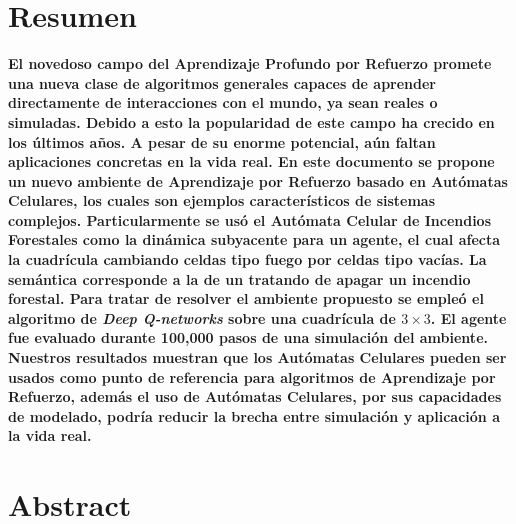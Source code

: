 \documentclass[
  12pt,
  openany]{book}
\author{}
\date{\vspace{-2.5em}}
\newenvironment{preliminary}%
{\pagestyle{empty}\pagenumbering{roman}}%
{\pagenumbering{arabic}}
\begin{document}
\begin{preliminary}






\end{preliminary}

\hypertarget{resumen}{%
\chapter*{Resumen}\label{resumen}}

\textbf{\large{El novedoso campo del Aprendizaje Profundo por Refuerzo promete una nueva clase de algoritmos generales capaces de aprender directamente de interacciones con el mundo, ya sean reales o simuladas. Debido a esto la popularidad de este campo ha crecido en los últimos años. A pesar de su enorme potencial, aún faltan aplicaciones concretas en la vida real. En este documento se propone un nuevo ambiente de Aprendizaje por Refuerzo basado en Autómatas Celulares, los cuales son ejemplos característicos de sistemas complejos. Particularmente se usó el Autómata Celular de Incendios Forestales como la dinámica subyacente para un agente, el cual afecta la cuadrícula cambiando celdas tipo fuego por celdas tipo vacías. La semántica corresponde a la de un  tratando de apagar un incendio forestal. Para tratar de resolver el ambiente propuesto se empleó el algoritmo de \emph{Deep Q-networks} sobre una cuadrícula de $3 \times 3$. El agente fue evaluado durante 100,000 pasos de una simulación del ambiente. Nuestros resultados muestran que los Autómatas Celulares pueden ser usados como punto de referencia para algoritmos de Aprendizaje por Refuerzo, además el uso de Autómatas Celulares, por sus capacidades de modelado, podría reducir la brecha entre simulación y aplicación a la vida real.}}

\hypertarget{abstract}{%
\chapter*{Abstract}\label{abstract}}
\end{document}
